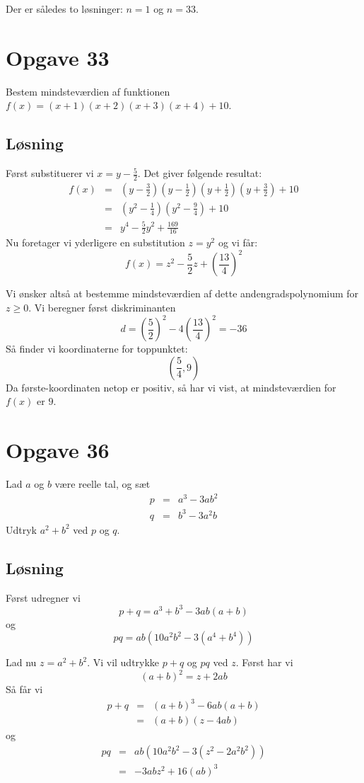\documentclass[12pt,oneside,a4paper]{article}
\newcommand{\bas}{\begin{eqnarray*}}
\newcommand{\eas}{\end{eqnarray*}}
\begin{document}
Der er således to løsninger: $n=1$ og $n=33$.

\section{Opgave 33}
Bestem mindsteværdien af funktionen $f(x) = (x+1)(x+2)(x+3)(x+4) + 10$.

\subsection{Løsning}
Først substituerer vi $x=y-\frac 52$. Det giver følgende resultat:
\bas
f(x) &=& \left(y-\frac 32\right) \left(y-\frac 12\right) \left(y+\frac 12\right) \left(y+\frac 32\right) + 10 \\
     &=& \left(y^2 - \frac 14\right) \left(y^2 - \frac 94\right) + 10 \\
     &=& y^4 - \frac 52 y^2 + \frac{169}{16}
\eas
Nu foretager vi yderligere en substitution $z=y^2$ og vi får:
$$
f(x) = z^2 - \frac 52 z + \left(\frac{13}{4}\right)^2
$$

Vi ønsker altså at bestemme mindsteværdien af dette andengradspolynomium for $z\ge 0$.
Vi beregner først diskriminanten
$$
d=\left(\frac 52\right)^2 - 4 \left(\frac{13}{4}\right)^2 = -36
$$
Så finder vi koordinaterne for toppunktet:
$$
\left(\frac 54, 9 \right)
$$
Da første-koordinaten netop er positiv, så har vi vist, at mindsteværdien for $f(x)$ er $9$.



\section{Opgave 36}
Lad $a$ og $b$ være reelle tal, og sæt
\bas
p &=& a^3 -3ab^2 \\
q &=& b^3 -3a^2b
\eas
Udtryk $a^2+b^2$ ved $p$ og $q$.

\subsection{Løsning}
Først udregner vi
$$
p+q = a^3+b^3-3ab(a+b)
$$
og
$$
pq = ab\left(10a^2b^2-3(a^4+b^4)\right)
$$

Lad nu $z=a^2+b^2$. Vi vil udtrykke $p+q$ og $pq$ ved $z$.
Først har vi
$$
(a+b)^2 = z + 2ab
$$
Så får vi
\bas
p+q &=& (a+b)^3-6ab(a+b) \\
    &=& (a+b)(z-4ab)
\eas
og
\bas
pq &=& ab(10a^2b^2-3(z^2-2a^2b^2)) \\
   &=& -3abz^2+16(ab)^3
\eas
\end{document}
